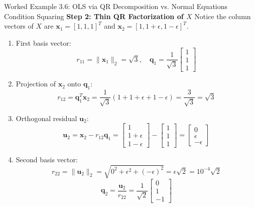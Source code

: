 \begin{examplebox}{Worked Example 3.6: OLS via QR Decomposition vs. Normal Equations Condition Squaring}
\textbf{Step 2: Thin QR Factorization of $X$}
Notice the column vectors of $X$ are $\mathbf{x}_1 = [1, 1, 1]^T$ and $\mathbf{x}_2 = [1, 1+\epsilon, 1-\epsilon]^T$.
\begin{enumerate}
    \item First basis vector:
    \begin{equation*}
    r_{11} = \|\mathbf{x}_1\|_2 = \sqrt{3}, \quad \mathbf{q}_1 = \frac{1}{\sqrt{3}} \begin{bmatrix} 1 \\ 1 \\ 1 \end{bmatrix}
    \end{equation*}
    \item Projection of $\mathbf{x}_2$ onto $\mathbf{q}_1$:
    \begin{equation*}
    r_{12} = \mathbf{q}_1^T \mathbf{x}_2 = \frac{1}{\sqrt{3}}(1 + 1 + \epsilon + 1 - \epsilon) = \frac{3}{\sqrt{3}} = \sqrt{3}
    \end{equation*}
    \item Orthogonal residual $\mathbf{u}_2$:
    \begin{equation*}
    \mathbf{u}_2 = \mathbf{x}_2 - r_{12}\mathbf{q}_1 = \begin{bmatrix} 1 \\ 1+\epsilon \\ 1-\epsilon \end{bmatrix} - \begin{bmatrix} 1 \\ 1 \\ 1 \end{bmatrix} = \begin{bmatrix} 0 \\ \epsilon \\ -\epsilon \end{bmatrix}
    \end{equation*}
    \item Second basis vector:
    \begin{equation*}
    r_{22} = \|\mathbf{u}_2\|_2 = \sqrt{0^2 + \epsilon^2 + (-\epsilon)^2} = \epsilon\sqrt{2} = 10^{-4}\sqrt{2}
    \end{equation*}
    \begin{equation*}
    \mathbf{q}_2 = \frac{\mathbf{u}_2}{r_{22}} = \frac{1}{\sqrt{2}} \begin{bmatrix} 0 \\ 1 \\ -1 \end{bmatrix}
    \end{equation*}

\end{enumerate}
\end{examplebox}
